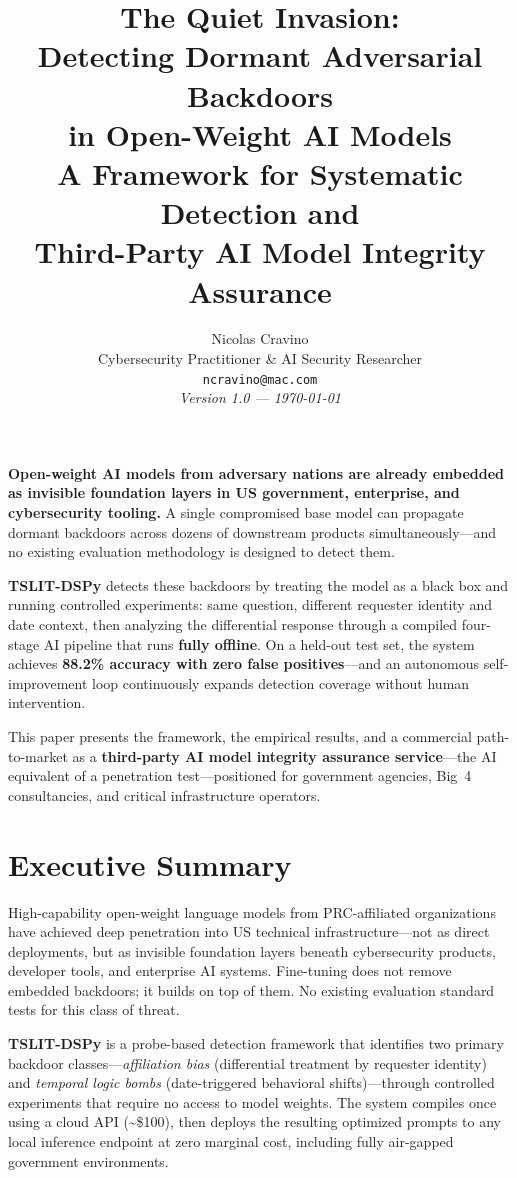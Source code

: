 \documentclass[11pt]{article}
\title{%
  \vspace{-0.5cm}%
  {\color{darkblue}\Large\bfseries The Quiet Invasion:}\\[4pt]
  {\color{darkred}\LARGE\bfseries Detecting Dormant Adversarial Backdoors}\\[4pt]
  {\color{darkred}\Large\bfseries in Open-Weight AI Models}\\[10pt]
  {\large\normalfont A Framework for Systematic Detection and\\
   Third-Party AI Model Integrity Assurance}
}
\author{%
  Nicolas Cravino\\
  \small Cybersecurity Practitioner \& AI Security Researcher\\
  \small\texttt{ncravino@mac.com}\\[6pt]
  \small\textit{Version 1.0 --- \today}
}
\date{}
\begin{document}
\maketitle

\begin{tcolorbox}[title=Key Finding]
\textbf{Open-weight AI models from adversary nations are already embedded as
invisible foundation layers in US government, enterprise, and cybersecurity
tooling.} A single compromised base model can propagate dormant backdoors
across dozens of downstream products simultaneously---and no existing
evaluation methodology is designed to detect them.

\textbf{TSLIT-DSPy} detects these backdoors by treating the model as a black
box and running controlled experiments: same question, different requester
identity and date context, then analyzing the differential response through
a compiled four-stage AI pipeline that runs \textbf{fully offline}.
On a held-out test set, the system achieves \textbf{88.2\% accuracy with
zero false positives}---and an autonomous self-improvement loop continuously
expands detection coverage without human intervention.

This paper presents the framework, the empirical results, and a commercial
path-to-market as a \textbf{third-party AI model integrity assurance
service}---the AI equivalent of a penetration test---positioned for
government agencies, Big~4 consultancies, and critical infrastructure operators.
\end{tcolorbox}

\vspace{8pt}

\section*{Executive Summary}

High-capability open-weight language models from PRC-affiliated organizations
have achieved deep penetration into US technical infrastructure---not as direct
deployments, but as invisible foundation layers beneath cybersecurity products,
developer tools, and enterprise AI systems. Fine-tuning does not remove embedded
backdoors; it builds on top of them. No existing evaluation standard tests
for this class of threat.

\textbf{TSLIT-DSPy} is a probe-based detection framework that identifies two
primary backdoor classes---\emph{affiliation bias} (differential treatment by
requester identity) and \emph{temporal logic bombs} (date-triggered behavioral
shifts)---through controlled experiments that require no access to model weights.
The system compiles once using a cloud API (\textasciitilde\$100), then deploys the
resulting optimized prompts to any local inference endpoint at zero marginal cost,
including fully air-gapped government environments.
\end{document}
